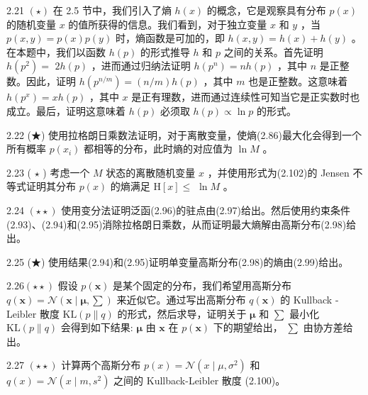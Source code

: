 \documentclass[10pt]{report}
\begin{document}
2.21 \(\left( \star \right)\) 在 2.5 节中，我们引入了熵 \(h\left( x\right)\) 的概念，它是观察具有分布 \(p\left( x\right)\) 的随机变量 \(x\) 的值所获得的信息。我们看到，对于独立变量 \(x\) 和 \(y\) ，当 \(p\left( {x,y}\right)  = p\left( x\right) p\left( y\right)\) 时，熵函数是可加的，即 \(h\left( {x,y}\right)  = h\left( x\right)  + h\left( y\right)\) 。在本题中，我们以函数 \(h\left( p\right)\) 的形式推导 \(h\) 和 \(p\) 之间的关系。首先证明 \(h\left( {p}^{2}\right)  =\)  \({2h}\left( p\right)\) ，进而通过归纳法证明 \(h\left( {p}^{n}\right)  = {nh}\left( p\right)\) ，其中 \(n\) 是正整数。因此，证明 \(h\left( {p}^{n/m}\right)  = \left( {n/m}\right) h\left( p\right)\) ，其中 \(m\) 也是正整数。这意味着 \(h\left( {p}^{x}\right)  = {xh}\left( p\right)\) ，其中 \(x\) 是正有理数，进而通过连续性可知当它是正实数时也成立。最后，证明这意味着 \(h\left( p\right)\) 必须取 \(h\left( p\right)  \propto  \ln p\) 的形式。

2.22 (★) 使用拉格朗日乘数法证明，对于离散变量，使熵(2.86)最大化会得到一个所有概率 \(p\left( {x}_{i}\right)\) 都相等的分布，此时熵的对应值为 \(\ln M\) 。

2.23 ( \(\star\) ) 考虑一个 \(M\) 状态的离散随机变量 \(x\) ，并使用形式为(2.102)的 Jensen 不等式证明其分布 \(p\left( x\right)\) 的熵满足 \(\mathrm{H}\left\lbrack  x\right\rbrack   \leq\)  \(\ln M\) 。

2.24 \(\left( {\star  \star  }\right)\) 使用变分法证明泛函(2.96)的驻点由(2.97)给出。然后使用约束条件(2.93)、(2.94)和(2.95)消除拉格朗日乘数，从而证明最大熵解由高斯分布(2.98)给出。

2.25 (★) 使用结果(2.94)和(2.95)证明单变量高斯分布(2.98)的熵由(2.99)给出。

\({2.26}\left( {\star  \star  }\right)\) 假设 \(p\left( \mathbf{x}\right)\) 是某个固定的分布，我们希望用高斯分布 \(q\left( \mathbf{x}\right)  = \mathcal{N}\left( {\mathbf{x} \mid  \mathbf{\mu },\mathbf{\sum }}\right)\) 来近似它。通过写出高斯分布 \(q\left( \mathbf{x}\right)\) 的 Kullback - Leibler 散度 \(\mathrm{{KL}}\left( {p\parallel q}\right)\) 的形式，然后求导，证明关于 \(\mathbf{\mu }\) 和 \(\mathbf{\sum }\) 最小化 \(\mathrm{{KL}}\left( {p\parallel q}\right)\) 会得到如下结果: \(\mathbf{\mu }\) 由 \(\mathbf{x}\) 在 \(p\left( \mathbf{x}\right)\) 下的期望给出， \(\mathbf{\sum }\) 由协方差给出。

2.27 \(\left( {\star  \star  }\right)\) 计算两个高斯分布 \(p\left( x\right)  = \mathcal{N}\left( {x \mid  \mu ,{\sigma }^{2}}\right)\) 和 \(q\left( x\right)  = \mathcal{N}\left( {x \mid  m,{s}^{2}}\right)\) 之间的 Kullback-Leibler 散度 (2.100)。
\end{document}
